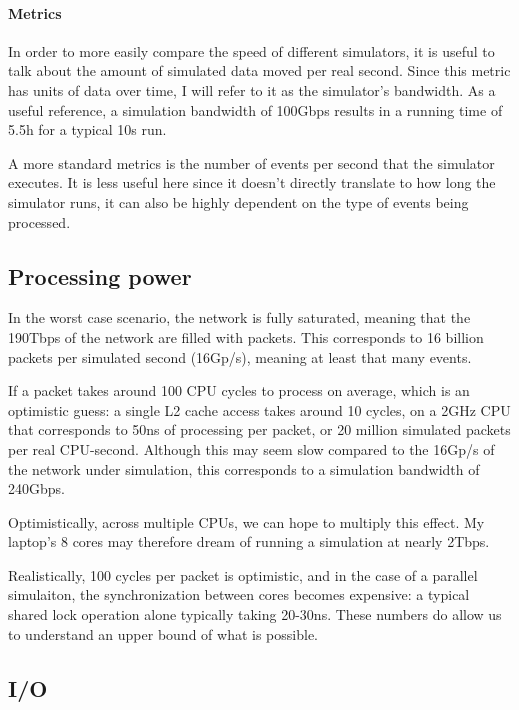 \paragraph{Metrics}
In order to more easily compare the speed of different simulators, it is useful to talk about the amount of simulated data moved per real second.
Since this metric has units of data over time, I will refer to it as the simulator's bandwidth.
As a useful reference, a simulation bandwidth of 100Gbps results in a running time of 5.5h for a typical 10s run.

A more standard metrics is the number of events per second that the simulator executes.
It is less useful here since it doesn't directly translate to how long the simulator runs, it can also be highly dependent on the type of events being processed.


\subsection{Processing power} \label{limits-cpu}

In the worst case scenario, the network is fully saturated, meaning that the 190Tbps of the network are filled with packets.
This corresponds to 16 billion packets per simulated second (16Gp/s), meaning at least that many events.

If a packet takes around 100 CPU cycles to process on average, which is an optimistic guess: a single L2 cache access takes around 10 cycles, on a 2GHz CPU that corresponds to 50ns of processing per packet, or 20 million simulated packets per real CPU-second. %
Although this may seem slow compared to the 16Gp/s of the network under simulation, this corresponds to a simulation bandwidth of 240Gbps.

Optimistically, across multiple CPUs, we can hope to multiply this effect.
My laptop's 8 cores may therefore dream of running a simulation at nearly 2Tbps.

Realistically, 100 cycles per packet is optimistic, and in the case of a parallel simulaiton, the synchronization between cores becomes expensive: a typical shared lock operation alone typically taking 20-30ns. %
These numbers do allow us to understand an upper bound of what is possible.



\subsection{I/O} \label{limits-io}

